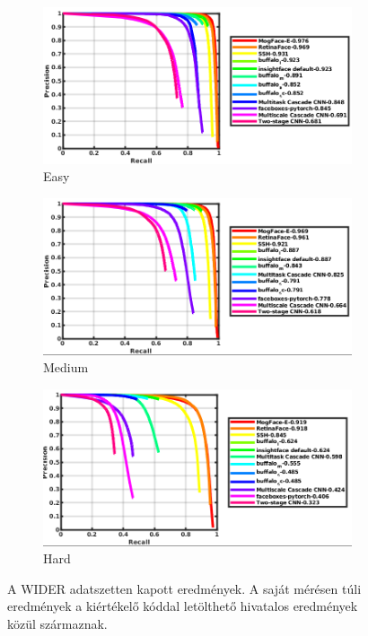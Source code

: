 \begin{figure}
    \centering
    \begin{subfigure}[b]{0.75\linewidth}
        \includegraphics[width=\linewidth]{figures/wider_easy.png}
        \caption{Easy}
    \end{subfigure}
    \begin{subfigure}[b]{0.75\linewidth}
        \includegraphics[width=\linewidth]{figures/wider_medium.png}
        \caption{Medium}
    \end{subfigure}
    \begin{subfigure}[b]{0.75\linewidth}
        \includegraphics[width=\linewidth]{figures/wider_hard.png}
        \caption{Hard}
    \end{subfigure}
    \caption{A WIDER adatszetten kapott eredmények. A saját mérésen túli eredmények a kiértékelő kóddal letölthető hivatalos eredmények\cite{noauthor_wider_nodate} közül származnak.}
    \label{fig:wider_evaluation}
\end{figure}

